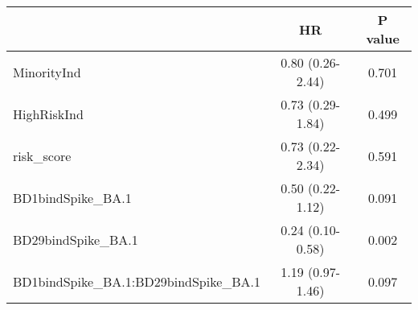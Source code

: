 \begin{tabular}{lcc}
   \hline  &HR& P value\\ 
\hline
MinorityInd & 0.80 (0.26-2.44) & 0.701 \\ 
  HighRiskInd & 0.73 (0.29-1.84) & 0.499 \\ 
  risk\_score & 0.73 (0.22-2.34) & 0.591 \\ 
  BD1bindSpike\_BA.1 & 0.50 (0.22-1.12) & 0.091 \\ 
  BD29bindSpike\_BA.1 & 0.24 (0.10-0.58) & 0.002 \\ 
  BD1bindSpike\_BA.1:BD29bindSpike\_BA.1 & 1.19 (0.97-1.46) & 0.097 \\ 
   \hline
\end{tabular}
